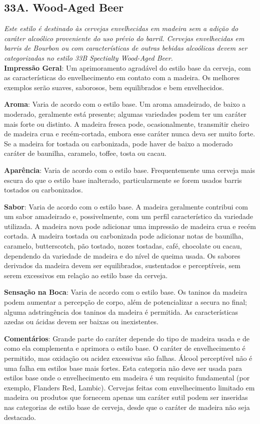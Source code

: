 \subsection*{33A. Wood-Aged Beer}
\textit{Este estilo é destinado às cervejas envelhecidas em madeira sem a adição do caráter alcoólico proveniente do uso prévio do barril. Cervejas envelhecidas em barris de Bourbon ou com características de outras bebidas alcoólicas devem ser categorizadas no estilo 33B Spectialty Wood-Aged Beer.}\\
\textbf{Impressão Geral}: Um aprimoramento agradável do estilo base da cerveja, com as características do envelhecimento em contato com a madeira. Os melhores exemplos serão suaves, saborosos, bem equilibrados e bem envelhecidos.

\textbf{Aroma}: Varia de acordo com o estilo base. Um aroma amadeirado, de baixo a moderado, geralmente está presente; algumas variedades podem ter um caráter mais forte ou distinto. A madeira fresca pode, ocasionalmente, transmitir cheiro de madeira crua e recém-cortada, embora esse caráter nunca deva ser muito forte. Se a madeira for tostada ou carbonizada, pode haver de baixo a moderado caráter de baunilha, caramelo, toffee, tosta ou cacau.

\textbf{Aparência}: Varia de acordo com o estilo base. Frequentemente uma cerveja mais escura do que o estilo base inalterado, particularmente se forem usados barris tostados ou carbonizados.

\textbf{Sabor}: Varia de acordo com o estilo base. A madeira geralmente contribui com um sabor amadeirado e, possivelmente, com um perfil característico da variedade utilizada. A madeira nova pode adicionar uma impressão de madeira crua e recém cortada. A madeira tostada ou carbonizada pode adicionar notas de baunilha, caramelo, butterscotch, pão tostado, nozes tostadas, café, chocolate ou cacau, dependendo da variedade de madeira e do nível de queima usada. Os sabores derivados da madeira devem ser equilibrados, sustentados e perceptíveis, sem serem excessivos em relação ao estilo base da cerveja.

\textbf{Sensação na Boca}: Varia de acordo com o estilo base. Os taninos da madeira podem aumentar a percepção de corpo, além de potencializar a secura no final; alguma adstringência dos taninos da madeira é permitida. As características azedas ou ácidas devem ser baixas ou inexistentes.

\textbf{Comentários}: Grande parte do caráter depende do tipo de madeira usada e de como ela complementa e aprimora o estilo base. O caráter de envelhecimento é permitido, mas oxidação ou acidez excessivas são falhas. Álcool perceptível não é uma falha em estilos base mais fortes. Esta categoria não deve ser usada para estilos base onde o envelhecimento em madeira é um requisito fundamental (por exemplo, Flanders Red, Lambic). Cervejas feitas com envelhecimento limitado em madeira ou produtos que fornecem apenas um caráter sutil podem ser inseridas nas categorias de estilo base de cerveja, desde que o caráter de madeira não seja destacado.

